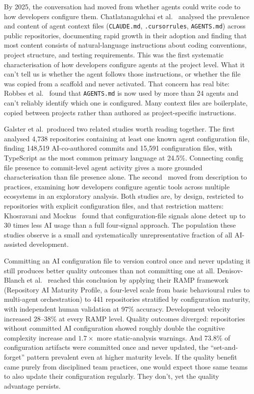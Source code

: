 By 2025, the conversation had moved from whether agents could write code to how developers configure them. Chatlatanagulchai et al.~\cite{chatlatanagulchai2025} analysed the prevalence and content of agent context files (\texttt{CLAUDE.md}, \texttt{.cursorrules}, \texttt{AGENTS.md}) across public repositories, documenting rapid growth in their adoption and finding that most content consists of natural-language instructions about coding conventions, project structure, and testing requirements. This was the first systematic characterisation of how developers configure agents at the project level. What it can't tell us is whether the agent follows those instructions, or whether the file was copied from a scaffold and never activated. That concern has real bite: Robbes et al.~\cite{robbesAgenticMuch2026} found that \texttt{AGENTS.md} is now used by more than 24 agents and can't reliably identify which one is configured. Many context files are boilerplate, copied between projects rather than authored as project-specific instructions.

Galster et al.\ produced two related studies worth reading together. The first~\cite{galsterConfig2026} analysed 4,738 repositories containing at least one known agent configuration file, finding 148,519 AI-co-authored commits and 15,591 configuration files, with TypeScript as the most common primary language at 24.5\%. Connecting config file presence to commit-level agent activity gives a more grounded characterisation than file presence alone. The second~\cite{galsterExploratory2026} moved from description to practices, examining how developers configure agentic tools across multiple ecosystems in an exploratory analysis. Both studies are, by design, restricted to repositories with explicit configuration files, and that restriction matters: Khosravani and Mockus~\cite{khosravani2026} found that configuration-file signals alone detect up to 30 times less AI usage than a full four-signal approach. The population these studies observe is a small and systematically unrepresentative fraction of all AI-assisted development.

Committing an AI configuration file to version control once and never updating it still produces better quality outcomes than not committing one at all. Denisov-Blanch et al.~\cite{denisovBlanch2026} reached this conclusion by applying their RAMP framework (Repository AI Maturity Profile, a four-level scale from basic behavioural rules to multi-agent orchestration) to 441 repositories stratified by configuration maturity, with independent human validation at 97\% accuracy. Development velocity increased 28--38\% at every RAMP level. Quality outcomes diverged: repositories without committed AI configuration showed roughly double the cognitive complexity increase and $1.7\times$ more static-analysis warnings. And 73.8\% of configuration artifacts were committed once and never updated, the ``set-and-forget'' pattern prevalent even at higher maturity levels. If the quality benefit came purely from disciplined team practices, one would expect those same teams to also update their configuration regularly. They don't, yet the quality advantage persists.

